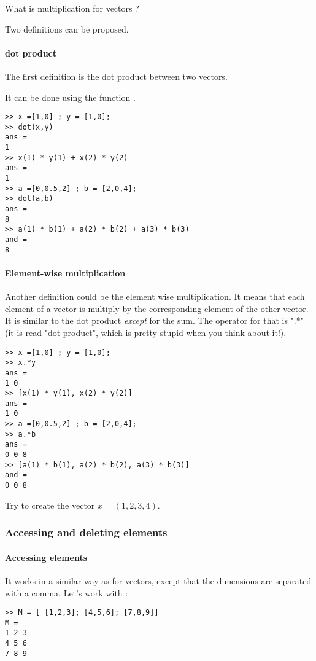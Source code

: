 What is multiplication for vectors ?

Two definitions can be proposed.

\paragraph{dot product}
The first definition is the dot product between two vectors.


It can be done using the function .
\begin{lstlisting}
>> x =[1,0] ; y = [1,0];
>> dot(x,y)
ans = 
1
>> x(1) * y(1) + x(2) * y(2)
ans =
1
>> a =[0,0.5,2] ; b = [2,0,4];
>> dot(a,b)
ans = 
8
>> a(1) * b(1) + a(2) * b(2) + a(3) * b(3)    
and =
8
\end{lstlisting}


\paragraph{Element-wise multiplication}
Another definition could be the element wise multiplication.
It means that each element of a vector is multiply by the corresponding element of the other vector.
It is similar to the dot product \emph{except} for the sum.
The operator for that is ".*" (it is read "dot product", which is pretty stupid when you think about it!).

\begin{lstlisting}
>> x =[1,0] ; y = [1,0];
>> x.*y
ans = 
1 0
>> [x(1) * y(1), x(2) * y(2)]
ans =
1 0
>> a =[0,0.5,2] ; b = [2,0,4];
>> a.*b
ans = 
0 0 8
>> [a(1) * b(1), a(2) * b(2), a(3) * b(3)]
and =
0 0 8
\end{lstlisting}



Try to create the vector $x = (1,2,3,4)$.



\subsubsection{Accessing and deleting elements}

\paragraph{Accessing elements}
It works in a similar way as for vectors, except that the dimensions are separated with a comma.
Let's work with :
\begin{lstlisting}
>> M = [ [1,2,3]; [4,5,6]; [7,8,9]]
M = 
1 2 3
4 5 6
7 8 9
\end{lstlisting}

